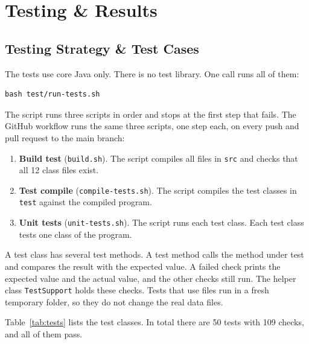 \chapter{Testing \& Results}

\section{Testing Strategy \& Test Cases}
The tests use core Java only. There is no test library. One call runs all of
them:

\begin{lstlisting}[style=console]
bash test/run-tests.sh
\end{lstlisting}

The script runs three scripts in order and stops at the first step that fails.
The GitHub workflow runs the same three scripts, one step each, on every push
and pull request to the main branch:
\begin{enumerate}
\item \textbf{Build test} (\texttt{build.sh}). The script compiles all files in \texttt{src} and
checks that all 12 class files exist.
\item \textbf{Test compile} (\texttt{compile-tests.sh}). The script compiles the test classes in
\texttt{test} against the compiled program.
\item \textbf{Unit tests} (\texttt{unit-tests.sh}). The script runs each test class. Each test class
tests one class of the program.
\end{enumerate}

A test class has several test methods. A test method calls the method under
test and compares the result with the expected value. A failed check prints the
expected value and the actual value, and the other checks still run. The helper
class \texttt{TestSupport} holds these checks. Tests that use files run in a
fresh temporary folder, so they do not change the real data files.

Table~\ref{tab:tests} lists the test classes. In total there are 50 tests with
109 checks, and all of them pass.

